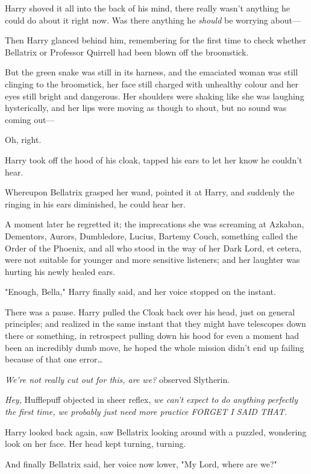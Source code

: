 Harry shoved it all into the back of his mind, there really wasn't anything he
could do about it right now. Was there anything he \emph{should} be worrying
about---

Then Harry glanced behind him, remembering for the first time to check whether
Bellatrix or Professor Quirrell had been blown off the broomstick.

But the green snake was still in its harness, and the emaciated woman was still
clinging to the broomstick, her face still charged with unhealthy colour and her
eyes still bright and dangerous. Her shoulders were shaking like she was
laughing hysterically, and her lips were moving as though to shout, but no
sound was coming out---

Oh, right.

Harry took off the hood of his cloak, tapped his ears to let her know he
couldn't hear.

Whereupon Bellatrix grasped her wand, pointed it at Harry, and suddenly the
ringing in his ears diminished, he could hear her.

A moment later he regretted it; the imprecations she was screaming at Azkaban,
Dementors, Aurors, Dumbledore, Lucius, Bartemy Couch, something called the
Order of the Phoenix, and all who stood in the way of her Dark Lord, et cetera,
were not suitable for younger and more sensitive listeners; and her laughter
was hurting his newly healed ears.

"Enough, Bella," Harry finally said, and her voice stopped on the instant.

There was a pause. Harry pulled the Cloak back over his head, just on general
principles; and realized in the same instant that they might have telescopes
down there or something, in retrospect pulling down his hood for even a moment
had been an incredibly dumb move, he hoped the whole mission didn't end up
failing because of that one error{\ldots}

\emph{We're not really cut out for this, are we?} observed Slytherin.

\emph{Hey,} Hufflepuff objected in sheer reflex, \emph{we can't expect to do
anything perfectly the first time, we probably just need more practice FORGET I
SAID THAT.}

Harry looked back again, saw Bellatrix looking around with a puzzled, wondering
look on her face. Her head kept turning, turning.

And finally Bellatrix said, her voice now lower, "My Lord, where are we?"

